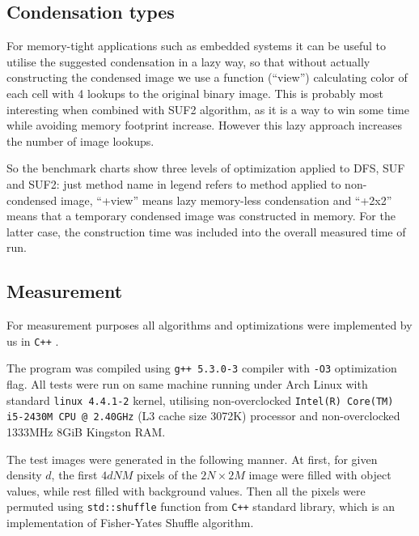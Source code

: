 \documentclass[hidelinks]{llncs}
\newcommand{\texten}[1]{#1}
\newcommand{\textru}[1]{}
\newcommand{\CXX}{\texttt{C++} \xspace}
\begin{document}
\subsection{Condensation types}

\texten{
For memory-tight applications such as embedded systems it can be useful to
utilise the suggested condensation in a lazy way, so that without actually
constructing the condensed image we use a function (``view'') calculating color of
each cell with 4 lookups to the original binary image.
This is probably most interesting when combined with SUF2 algorithm, as it is a way
to win some time while avoiding memory footprint increase.
However this lazy approach increases the number of image lookups.
}\textru{
В некоторых случаях может быть более приемлемо использовать сжатие неявно, то
есть вместо построения 
}

So the benchmark charts show three levels of optimization applied to
DFS, SUF and SUF2:
just method name in legend refers to method applied to non-condensed image,
``+view'' means lazy memory-less condensation
and ``+2x2'' means that a temporary condensed image was constructed in memory.
For the latter case, the construction time was included into the overall measured
time of run.

\subsection{Measurement}

For measurement purposes all algorithms and optimizations were implemented by us in \CXX.

The program was compiled using \texttt{g++ 5.3.0-3} compiler with \texttt{-O3} optimization flag.
All tests were run on same machine running under Arch Linux with standard \texttt{linux 4.4.1-2} kernel,
utilising non-overclocked \texttt{Intel(R) Core(TM) i5-2430M CPU @ 2.40GHz} (L3 cache size 3072K) processor and non-overclocked 1333MHz 8GiB Kingston RAM.

The test images were generated in the following manner. At first, 
for given density $d$, the first $4dNM$ pixels of
the $2N \times 2M$ image were filled with object values, while rest filled with background values.
Then all the pixels were permuted using \texttt{std::shuffle} function from \CXX standard library,
which is an implementation of Fisher-Yates Shuffle algorithm\cite{fisher:yates}.
\end{document}
